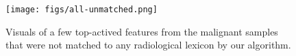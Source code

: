 \documentclass[twocolumn,final]{elsarticle}
\begin{document}
\begin{figure}
    \centering
    \texttt{[image: figs/all-unmatched.png]}
    \caption{Visuals of a few top-actived features from the malignant samples that were not matched to any radiological lexicon by our algorithm.}
    \label{fig:unknown-new}
\end{figure}

{}

\end{document}
